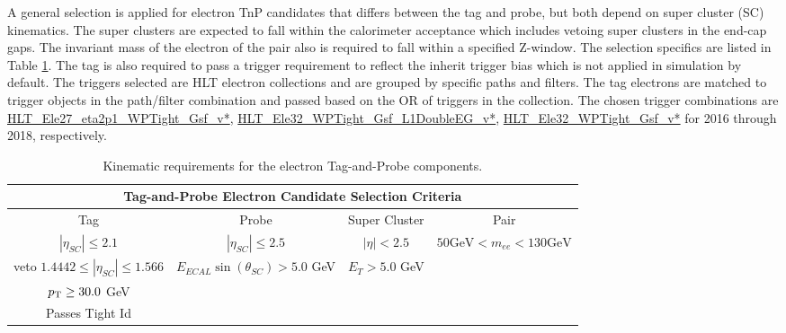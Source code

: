 A general selection is applied for electron TnP candidates that differs between the tag and probe, but both depend on super cluster (SC) kinematics. The super clusters are expected to fall within the calorimeter acceptance which includes vetoing super clusters in the end-cap gaps. The invariant mass of the electron of the pair also is required to fall within a specified Z-window. The selection specifics are listed in Table \ref{tab:eleTnPSelect}.  The tag is also required to pass a trigger requirement to reflect the inherit trigger bias which is not applied in simulation by default. The triggers selected are HLT electron collections and are grouped by specific paths and filters. The tag electrons are matched to trigger objects in the path/filter combination and passed based on the OR of triggers in the collection. The chosen trigger combinations are \url{HLT_Ele27_eta2p1_WPTight_Gsf_v*}, \url{HLT_Ele32_WPTight_Gsf_L1DoubleEG_v*}, \url{HLT_Ele32_WPTight_Gsf_v*} for 2016 through 2018, respectively.\\

\begin{table}
\caption{Kinematic requirements for the electron Tag-and-Probe components.}
\label{tab:eleTnPSelect}
\begin{adjustwidth}{-0.45in}{-1in}
\begin{tabular}{|c|c|c|c|}
\hline 
\multicolumn{4}{|c|}{Tag-and-Probe Electron Candidate Selection Criteria} \\ 
\hline 
Tag & Probe & Super Cluster & Pair \\ 
\hline 
$|\eta_{SC}| \leq 2.1$ & $|\eta_{SC}| \leq 2.5$  & $|\eta|<2.5 $ & $50 \text{GeV} < m_{ee} < 130 \text{GeV} $ \\
veto $ 1.4442 \leq |\eta_{SC}| \leq 1.566 $ & $E_{ECAL}\sin(\theta_{SC}) > 5.0 $ GeV & $E_T > 5.0 $ GeV &  \\
 $p_{\mathrm{T}} \geq 30.0$ GeV &  &  &  \\
 Passes Tight Id &  &  & \\
\hline 
\end{tabular} 
\end{adjustwidth}
\end{table}





